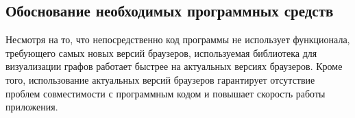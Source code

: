 \subsection{Обоснование необходимых программных средств}

Несмотря на то, что непосредственно код программы не использует функционала, требующего самых новых версий браузеров, используемая библиотека для визуализации графов \cite{echarts} работает быстрее на актуальных версиях браузеров.
Кроме того, использование актуальных версий браузеров гарантирует отсутствие проблем совместимости с программным кодом и повышает скорость работы приложения.